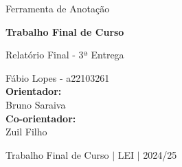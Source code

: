 \begin{titlepage}
    \BgThispage
    \centering
    \vspace*{7cm}
    
    {\fontsize{50}{1.15}\selectfont Ferramenta de Anotação}
    \vspace{3cm}

    {\fontsize{29}{1.15}\selectfont
        \textbf{Trabalho Final de Curso}\\
    }

    \vspace{1\baselineskip}
    {\fontsize{14}{1.15}\selectfont
        Relatório Final - 3ª Entrega
    }

    \vspace{5.5cm}
    {\fontsize{10}{16}\selectfont
        {Fábio Lopes - a22103261} \\
        {\textbf{Orientador:}} \\
        {Bruno Saraiva} \\
        {\textbf{Co-orientador:}} \\
        {Zuil Filho}

        \vspace{0.3cm}
        Trabalho Final de Curso $|$ LEI $|$ {2024/25}
    }
\end{titlepage}